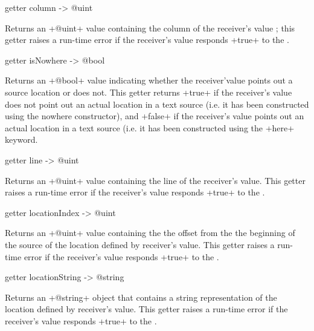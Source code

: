 
\begin{galgas}
getter column -> @uint
\end{galgas}

Returns an \ggs+@uint+ value containing the column of the receiver's value ; this getter raises a run-time error if the receiver's value responds \ggs+true+ to the .



\begin{galgas}
getter isNowhere -> @bool
\end{galgas}

Returns an \ggs+@bool+ value indicating whether the receiver'value points out a source location or does not. This getter returns \ggs+true+ if the receiver's value does not point out an actual location in a text source (i.e. it has been constructed using the nowhere constructor), and \ggs+false+ if the receiver's value points out an actual location in a text source (i.e. it has been constructed using the \ggs+here+ keyword.



\begin{galgas}
getter line -> @uint
\end{galgas}

Returns an \ggs+@uint+ value containing the line of the receiver's value. This getter raises a run-time error if the receiver's value responds \ggs+true+ to the .



\begin{galgas}
getter locationIndex -> @uint
\end{galgas}

Returns an \ggs+@uint+ value containing the the offset from the the beginning of the source of the location defined by receiver's value. This getter raises a run-time error if the receiver's value responds \ggs+true+ to the .



\begin{galgas}
getter locationString -> @string
\end{galgas}

Returns an \ggs+@string+ object that contains a string representation of the location defined by receiver's value. This getter raises a run-time error if the receiver's value responds \ggs+true+ to the .
